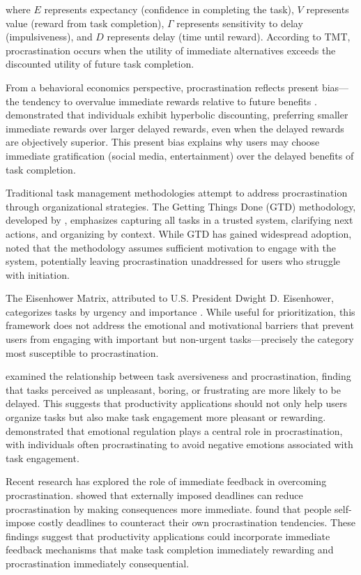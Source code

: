 where $E$ represents expectancy (confidence in completing the task), $V$ represents value (reward from task completion), $\Gamma$ represents sensitivity to delay (impulsiveness), and $D$ represents delay (time until reward). According to TMT, procrastination occurs when the utility of immediate alternatives exceeds the discounted utility of future task completion.

From a behavioral economics perspective, procrastination reflects present bias---the tendency to overvalue immediate rewards relative to future benefits \citep{o1999doing}. \citet{laibson1997golden} demonstrated that individuals exhibit hyperbolic discounting, preferring smaller immediate rewards over larger delayed rewards, even when the delayed rewards are objectively superior. This present bias explains why users may choose immediate gratification (social media, entertainment) over the delayed benefits of task completion.

Traditional task management methodologies attempt to address procrastination through organizational strategies. The Getting Things Done (GTD) methodology, developed by \citet{allen2015getting}, emphasizes capturing all tasks in a trusted system, clarifying next actions, and organizing by context. While GTD has gained widespread adoption, \citet{heylighen2016getting} noted that the methodology assumes sufficient motivation to engage with the system, potentially leaving procrastination unaddressed for users who struggle with initiation.

The Eisenhower Matrix, attributed to U.S. President Dwight D. Eisenhower, categorizes tasks by urgency and importance \citep{covey2004seven}. While useful for prioritization, this framework does not address the emotional and motivational barriers that prevent users from engaging with important but non-urgent tasks---precisely the category most susceptible to procrastination.

\citet{blunt2000dissertation} examined the relationship between task aversiveness and procrastination, finding that tasks perceived as unpleasant, boring, or frustrating are more likely to be delayed. This suggests that productivity applications should not only help users organize tasks but also make task engagement more pleasant or rewarding. \citet{tice2001emotional} demonstrated that emotional regulation plays a central role in procrastination, with individuals often procrastinating to avoid negative emotions associated with task engagement.

Recent research has explored the role of immediate feedback in overcoming procrastination. \citet{ariely2002procrastination} showed that externally imposed deadlines can reduce procrastination by making consequences more immediate. \citet{wertenbroch2002procrastination} found that people self-impose costly deadlines to counteract their own procrastination tendencies. These findings suggest that productivity applications could incorporate immediate feedback mechanisms that make task completion immediately rewarding and procrastination immediately consequential.

